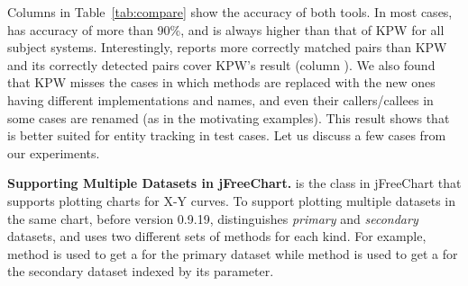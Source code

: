 
Columns  in Table~\ref{tab:compare} show the accuracy
of both tools. In most cases, {\tool} has accuracy of more than
90\%, and is always higher than that of KPW for all subject
systems. Interestingly, {\tool} reports more correctly matched pairs
than KPW and its correctly detected pairs cover KPW's result (column
\code{$\bigcap$}). We also found that KPW misses the
cases in which methods are replaced with the new ones having different
implementations and names, and even their callers/callees in some
cases are renamed (as in the motivating examples). This result shows
that {\tool} is better suited for entity tracking in test cases.
Let us discuss a few
cases from our experiments.




\vspace{0.04in} {\bf Supporting Multiple Datasets in jFreeChart.}
 is the class in jFreeChart that supports plotting charts
for X-Y curves. To support plotting multiple datasets in the same
chart, before version 0.9.19,  distinguishes
\emph{primary} and \emph{secondary} datasets, and uses two different
sets of methods for each kind. For example,
method  is used
to get a  for the primary dataset while
method  is used to get a  for the secondary dataset indexed by its parameter.

